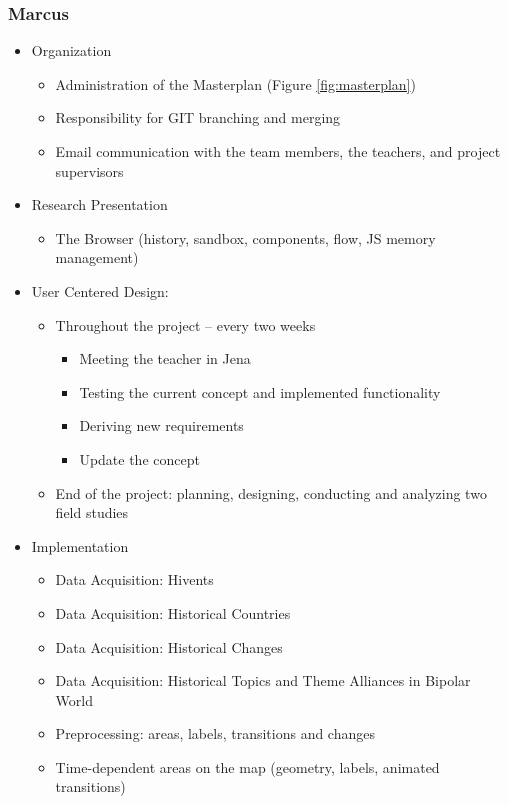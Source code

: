 \subsubsection{Marcus} %
\label{ssub:marcus}

\begin{itemize}
  \item Organization
  \begin{itemize}
    \item Administration of the Masterplan (Figure \ref{fig:masterplan})
    \item Responsibility for GIT branching and merging
    \item Email communication with the team members, the teachers, and project supervisors
  \end{itemize}
  \item Research Presentation
  \begin{itemize}
    \item The Browser (history, sandbox, components, flow, JS memory management)
  \end{itemize}
  \item User Centered Design:
  \begin{itemize}
    \item Throughout the project -- every two weeks
    \begin{itemize}
      \item Meeting the teacher in Jena
      \item Testing the current concept and implemented functionality
      \item Deriving new requirements
      \item Update the concept
    \end{itemize}
    \item End of the project: planning, designing, conducting and analyzing two field studies
  \end{itemize}
  \item Implementation
  \begin{itemize}
    \item Data Acquisition: Hivents
    \item Data Acquisition: Historical Countries
    \item Data Acquisition: Historical Changes
    \item Data Acquisition: Historical Topics and Theme Alliances in Bipolar World
    \item Preprocessing: areas, labels, transitions and changes
    \item Time-dependent areas on the map (geometry, labels, animated transitions)

\end{itemize}
\end{itemize}
